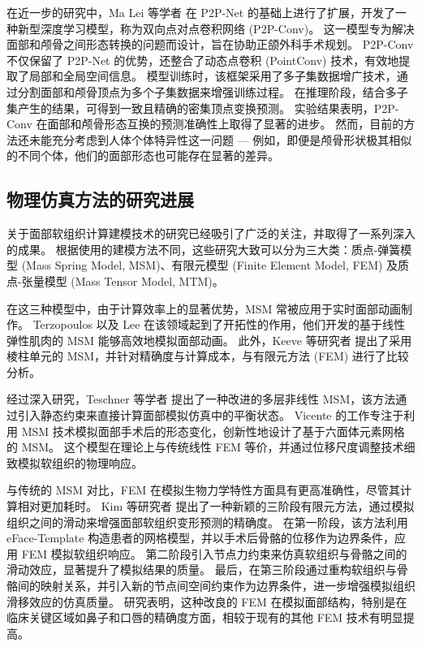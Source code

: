 在近一步的研究中，Ma Lei 等学者 \cite{maBidirectionalPredictionFacial2023} 在 P2P-Net \cite{yinP2PNETBidirectionalPoint2018} 的基础上进行了扩展，开发了一种新型深度学习模型，称为双向点对点卷积网络 (P2P-Conv)。
这一模型专为解决面部和颅骨之间形态转换的问题而设计，旨在协助正颌外科手术规划。
P2P-Conv 不仅保留了 P2P-Net 的优势，还整合了动态点卷积 (PointConv) 技术，有效地提取了局部和全局空间信息。
模型训练时，该框架采用了多子集数据增广技术，通过分割面部和颅骨顶点为多个子集数据来增强训练过程。
在推理阶段，结合多子集产生的结果，可得到一致且精确的密集顶点变换预测。
实验结果表明，P2P-Conv 在面部和颅骨形态互换的预测准确性上取得了显著的进步。
然而，目前的方法还未能充分考虑到人体个体特异性这一问题 --- 例如，即便是颅骨形状极其相似的不同个体，他们的面部形态也可能存在显著的差异。

\subsection{物理仿真方法的研究进展}

关于面部软组织计算建模技术的研究已经吸引了广泛的关注，并取得了一系列深入的成果。
根据使用的建模方法不同，这些研究大致可以分为三大类：质点-弹簧模型 (Mass Spring Model, MSM)、有限元模型 (Finite Element Model, FEM) 及质点-张量模型 (Mass Tensor Model, MTM)。

在这三种模型中，由于计算效率上的显著优势，MSM 常被应用于实时面部动画制作。
Terzopoulos \cite{terzopoulosPhysicallyBasedFacial1990} 以及 Lee \cite{leeRealisticModelingFacial1995} 在该领域起到了开拓性的作用，他们开发的基于线性弹性肌肉的 MSM 能够高效地模拟面部动画。
此外，Keeve 等研究者 \cite{keeveDeformableModelingFacial1998} 提出了采用棱柱单元的 MSM，并针对精确度与计算成本，与有限元方法 (FEM) 进行了比较分析。

经过深入研究，Teschner 等学者 \cite{teschnerDirectComputationNonlinear} 提出了一种改进的多层非线性 MSM，该方法通过引入静态约束来直接计算面部模拟仿真中的平衡状态。
Vicente \cite{vicenteMaxillofacialSurgerySimulation2009} 的工作专注于利用 MSM 技术模拟面部手术后的形态变化，创新性地设计了基于六面体元素网格的 MSM。
这个模型在理论上与传统线性 FEM 等价，并通过位移尺度调整技术细致模拟软组织的物理响应。

与传统的 MSM 对比，FEM 在模拟生物力学特性方面具有更高准确性，尽管其计算相对更加耗时。
Kim 等研究者 \cite{kimClinicallyValidatedPrediction2017} 提出了一种新颖的三阶段有限元方法，通过模拟组织之间的滑动来增强面部软组织变形预测的精确度。
在第一阶段，该方法利用 eFace-Template \cite{zhangEFacetemplateMethodEfficiently2016} 构造患者的网格模型，并以手术后骨骼的位移作为边界条件，应用 FEM 模拟软组织响应。
第二阶段引入节点力约束来仿真软组织与骨骼之间的滑动效应，显著提升了模拟结果的质量。
最后，在第三阶段通过重构软组织与骨骼间的映射关系，并引入新的节点间空间约束作为边界条件，进一步增强模拟组织滑移效应的仿真质量。
研究表明，这种改良的 FEM 在模拟面部结构，特别是在临床关键区域如鼻子和口唇的精确度方面，相较于现有的其他 FEM 技术有明显提高。


